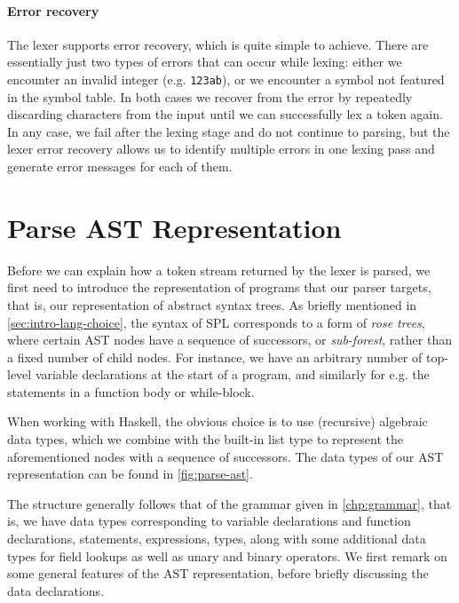 \paragraph{Error recovery}
The lexer supports error recovery, which is quite simple to achieve.
There are essentially just two types of errors that can occur while lexing:
either we encounter an invalid integer (e.g. \verb|123ab|),
or we encounter a symbol not featured in the symbol table.
In both cases we recover from the error by repeatedly discarding characters from
the input until we can successfully lex a token again.
In any case, we fail after the lexing stage and do not continue to parsing, but
the lexer error recovery allows us to identify multiple errors in one lexing
pass and generate error messages for each of them.



\section{Parse AST Representation} \label{sec:parse-ast}

Before we can explain how a token stream returned by the lexer is parsed, we
first need to introduce the representation of programs that our parser targets,
that is, our representation of abstract syntax trees.
As briefly mentioned in \cref{sec:intro-lang-choice}, the syntax of SPL
corresponds to a form of \emph{rose trees}, where certain AST nodes have a
sequence of successors, or \emph{sub-forest}, rather than a fixed number of
child nodes.
For instance, we have an arbitrary number of top-level variable declarations at
the start of a program, and similarly for e.g. the statements in a function body
or while-block.

When working with Haskell, the obvious choice is to use (recursive) algebraic
data types, which we combine with the built-in list type to represent the
aforementioned nodes with a sequence of successors.
The data types of our AST representation can be found in \cref{fig:parse-ast}.

The structure generally follows that of the grammar given in \cref{chp:grammar},
that is, we have data types corresponding to variable declarations and function
declarations, statements, expressions, types, along with some additional data
types for field lookups as well as unary and binary operators.
We first remark on some general features of the AST representation, before
briefly discussing the data declarations.


